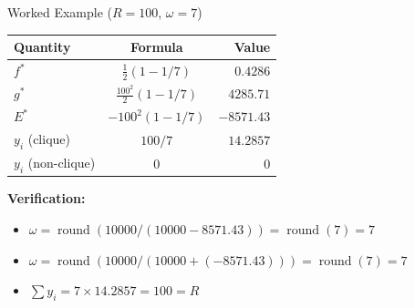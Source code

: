 \documentclass[aspectratio=169]{beamer}
\begin{document}
\begin{frame}{Worked Example ($R=100$, $\omega=7$)}
    \centering
    \begin{tabular}{@{}lcr@{}}
        \toprule
        \textbf{Quantity} & \textbf{Formula} & \textbf{Value} \\
        \midrule
        $f^*$              & $\frac{1}{2}(1 - 1/7)$                    & $0.4286$ \\[4pt]
        $g^*$              & $\frac{100^2}{2}(1 - 1/7)$               & $4285.71$ \\[4pt]
        $E^*$              & $-100^2(1 - 1/7)$                        & $-8571.43$ \\[4pt]
        $y_i$ (clique)     & $100/7$                                   & $14.2857$ \\[4pt]
        $y_i$ (non-clique) & $0$                                       & $0$ \\
        \bottomrule
    \end{tabular}

    \vspace{1em}
    \raggedright
    \textbf{Verification:}
    \begin{itemize}
        \item $\omega = \operatorname{round}(10000 / (10000 - 8571.43)) = \operatorname{round}(7) = 7$ \checkmark
        \item $\omega = \operatorname{round}(10000 / (10000 + (-8571.43))) = \operatorname{round}(7) = 7$ \checkmark
        \item $\sum y_i = 7 \times 14.2857 = 100 = R$ \checkmark
    \end{itemize}
\end{frame}
\end{document}
